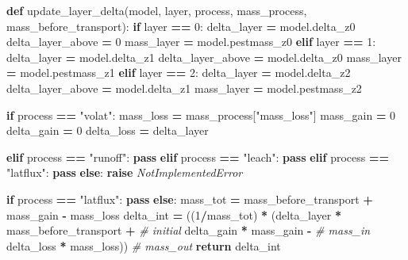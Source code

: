 \documentclass[]{article}
\newenvironment{Shaded}{\begin{snugshade}}{\end{snugshade}}
\newcommand{\KeywordTok}[1]{\textcolor[rgb]{0.13,0.29,0.53}{\textbf{{#1}}}}
\newcommand{\DecValTok}[1]{\textcolor[rgb]{0.00,0.00,0.81}{{#1}}}
\newcommand{\StringTok}[1]{\textcolor[rgb]{0.31,0.60,0.02}{{#1}}}
\newcommand{\CommentTok}[1]{\textcolor[rgb]{0.56,0.35,0.01}{\textit{{#1}}}}
\newcommand{\ControlFlowTok}[1]{\textcolor[rgb]{0.13,0.29,0.53}{\textbf{{#1}}}}
\newcommand{\OperatorTok}[1]{\textcolor[rgb]{0.81,0.36,0.00}{\textbf{{#1}}}}
\newcommand{\PreprocessorTok}[1]{\textcolor[rgb]{0.56,0.35,0.01}{\textit{{#1}}}}
\newcommand{\NormalTok}[1]{{#1}}
\begin{document}
\begin{Shaded}
\begin{Highlighting}[]

\KeywordTok{def} \NormalTok{update_layer_delta(model, layer, process, mass_process, mass_before_transport):}
    \ControlFlowTok{if} \NormalTok{layer }\OperatorTok{==} \DecValTok{0}\NormalTok{:}
      \NormalTok{delta_layer }\OperatorTok{=} \NormalTok{model.delta_z0}
      \NormalTok{delta_layer_above }\OperatorTok{=} \DecValTok{0}
      \NormalTok{mass_layer }\OperatorTok{=} \NormalTok{model.pestmass_z0}
    \ControlFlowTok{elif} \NormalTok{layer }\OperatorTok{==} \DecValTok{1}\NormalTok{:}
        \NormalTok{delta_layer }\OperatorTok{=} \NormalTok{model.delta_z1}
        \NormalTok{delta_layer_above }\OperatorTok{=} \NormalTok{model.delta_z0}
        \NormalTok{mass_layer }\OperatorTok{=} \NormalTok{model.pestmass_z1}
    \ControlFlowTok{elif} \NormalTok{layer }\OperatorTok{==} \DecValTok{2}\NormalTok{:}
        \NormalTok{delta_layer }\OperatorTok{=} \NormalTok{model.delta_z2}
        \NormalTok{delta_layer_above }\OperatorTok{=} \NormalTok{model.delta_z1}
        \NormalTok{mass_layer }\OperatorTok{=} \NormalTok{model.pestmass_z2}
        
    \ControlFlowTok{if} \NormalTok{process }\OperatorTok{==} \StringTok{"volat"}\NormalTok{:}
        \NormalTok{mass_loss }\OperatorTok{=} \NormalTok{mass_process[}\StringTok{"mass_loss"}\NormalTok{]}
        \NormalTok{mass_gain }\OperatorTok{=} \DecValTok{0}
        \NormalTok{delta_gain }\OperatorTok{=} \DecValTok{0}
        \NormalTok{delta_loss }\OperatorTok{=} \NormalTok{delta_layer}
        
    \ControlFlowTok{elif} \NormalTok{process }\OperatorTok{==} \StringTok{"runoff"}\NormalTok{:}
        \ControlFlowTok{pass}
    \ControlFlowTok{elif} \NormalTok{process }\OperatorTok{==} \StringTok{"leach"}\NormalTok{:}
        \ControlFlowTok{pass}
    \ControlFlowTok{elif} \NormalTok{process }\OperatorTok{==} \StringTok{"latflux"}\NormalTok{:}
        \ControlFlowTok{pass}
    \ControlFlowTok{else}\NormalTok{:}
        \ControlFlowTok{raise} \PreprocessorTok{NotImplementedError}

    \ControlFlowTok{if} \NormalTok{process }\OperatorTok{==} \StringTok{"latflux"}\NormalTok{:}
        \ControlFlowTok{pass}
    \ControlFlowTok{else}\NormalTok{:}
        \NormalTok{mass_tot }\OperatorTok{=} \NormalTok{mass_before_transport }\OperatorTok{+} \NormalTok{mass_gain }\OperatorTok{-} \NormalTok{mass_loss}
        \NormalTok{delta_int }\OperatorTok{=} \NormalTok{((}\DecValTok{1}\OperatorTok{/}\NormalTok{mass_tot) }\OperatorTok{*}
                     \NormalTok{(delta_layer }\OperatorTok{*} \NormalTok{mass_before_transport }\OperatorTok{+}  \CommentTok{# initial}
                      \NormalTok{delta_gain }\OperatorTok{*} \NormalTok{mass_gain }\OperatorTok{-}  \CommentTok{# mass_in}
                      \NormalTok{delta_loss }\OperatorTok{*} \NormalTok{mass_loss))  }\CommentTok{# mass_out}
    \ControlFlowTok{return} \NormalTok{delta_int}
                       
\end{Highlighting}
\end{Shaded}
\end{document}
